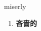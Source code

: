 
\begin{frame}
{\huge miserly}
\begin{center}
\begin{enumerate}\Large
  \item \textbf{吝啬的}
\end{enumerate}
\end{center}
\end{frame}
